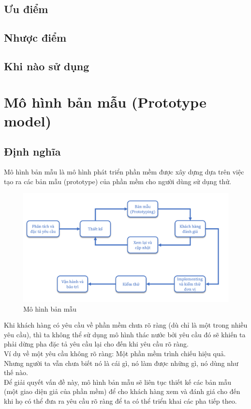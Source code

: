 \documentclass[14pt]{extarticle}
\begin{document}
\subsection{Ưu điểm}
\subsection{Nhược điểm}
\subsection{Khi nào sử dụng}

\newpage
\section{Mô hình bản mẫu (Prototype model)}
\subsection{Định nghĩa}
Mô hình bản mẫu là mô hình phát triển phần mềm được xây dựng
dựa trên việc tạo ra các bản mẫu (prototype) của phần mềm cho người dùng
sử dụng thử.\\

\begin{figure}[h]
  \centering
  \includegraphics[width=\textwidth]{prototype.png}
  \caption{Mô hình bản mẫu}
  \label{fig:prototype-model}
\end{figure}

Khi khách hàng có yêu cầu về phần mềm chưa rõ ràng (dù chỉ là một trong
nhiều yêu cầu), thì ta không thể sử dụng mô hình thác nước bởi yêu cầu đó
sẽ khiến ta phải dừng pha đặc tả yêu cầu lại cho đến khi yêu cầu rõ ràng.\\
Ví dụ về một yêu cầu không rõ ràng: Một phần mềm trình chiếu hiệu quả.
Nhưng người ta vẫn chưa biết nó là cái gì, nó làm được những gì, nó dùng
như thế nào.\\
Để giải quyết vấn đề này, mô hình bản mẫu sẽ liên tục thiết kế các bản mẫu
(một giao diện giả của phần mềm) để cho khách hàng xem và đánh giá cho
đến khi họ có thể đưa ra yêu cầu rõ ràng để ta có thể triển khai các pha
tiếp theo.
\end{document}
